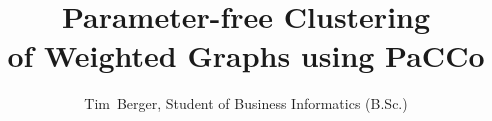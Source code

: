 \documentclass[12pt,journal,compsoc]{IEEEtran}
\numberwithin{equation}{section}
\begin{document}
%
\title{Parameter-free Clustering \\ of Weighted Graphs  using PaCCo}
%
%
%
%

\author{Tim~Berger, Student of Business Informatics (B.Sc.)}%


% 
%
\end{document}
